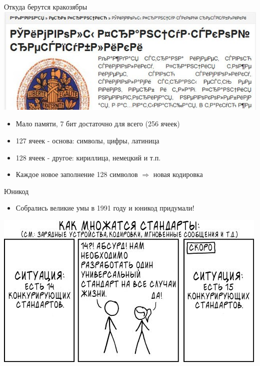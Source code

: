 \documentclass[newPxFont]{beamer}
\begin{document}
\begin{frame}{Откуда берутся кракозябры} 
\centering \includegraphics[width=0.7\linewidth]{krakozabr.jpg}	
\vspace{0.3cm}

\begin{itemize}
\item Мало памяти, 7 бит достаточно для всего (256 ячеек)
\item 127 ячеек - основа: символы, цифры, латиница
\item 128 ячеек - другое: кириллица, немецкий и т.п.
\item Каждое новое заполнение 128 символов $\Rightarrow$ новая кодировка
\end{itemize}
\end{frame}




\begin{frame}{Юникод} 
\begin{itemize}
\item Собрались великие умы в 1991 году и юникод придумали!
\end{itemize}

\centering  \includegraphics[width=0.7\linewidth]{stdcom.jpg}	
\end{frame}
\end{document}
